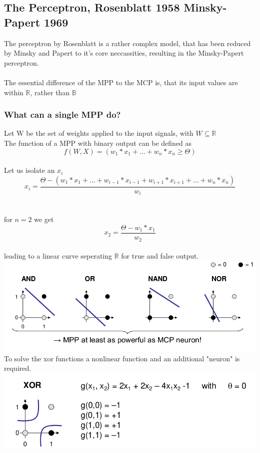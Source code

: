 \documentclass{article}
\begin{document}
\subsection{The Perceptron, Rosenblatt 1958 Minsky-Papert 1969}
The perceptron by Rosenblatt is a rather complex model, that has been reduced by Minsky and Papert to it's core neccassities,
resulting in the Minsky-Papert perceptron.\\
\\
The essential difference of the MPP to the MCP is, that its input values are within $\mathbb{R}$, rather than $\mathbb{B}$\\
\subsubsection{What can a single MPP do?}
Let W be the set of weights applied to the input signals, with $W \subseteq \mathbb{R}$\\
The function of a MPP with binary output can be defined as
$$
f(W, X)  = (w_1*x_1 + ... + w_n*x_n \geq \Theta)
$$
\\
Let us isolate an $x_i$\\
$$
x_i = \frac{ \Theta - (w_1*x_1+ ...+w_{i-1}*x_{i-1}+w_{i+1}*x_{i+1}+... + w_n * x_n)}{w_i}
$$\\
\\
for $n=2$ we get
$$
x_2 = \frac{ \Theta - w_1*x_1}{w_2}
$$\\
leading to a linear curve seperating $\mathbb{R}$ for true and false output.\\
\includegraphics[width=1\textwidth]{MPP.png}
\\
To solve the xor functions a nonlinear function and an additional "neuron" is required.\\
\includegraphics[width=1\textwidth]{XOR.png}
\end{document}
